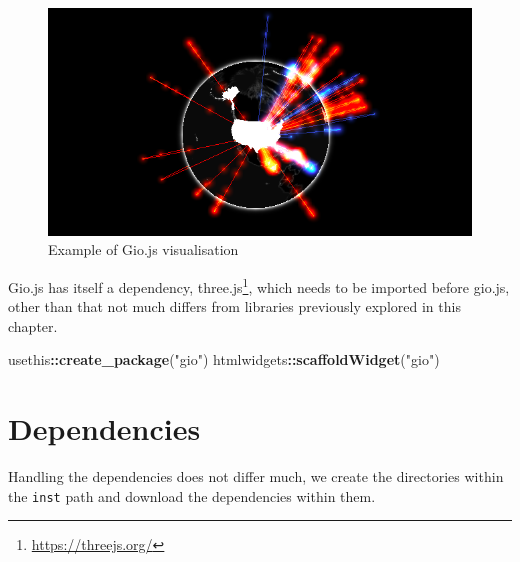 \documentclass[
]{krantz}
\makeatletter
\newenvironment{Shaded}{\begin{snugshade}}{\end{snugshade}}
\newcommand{\KeywordTok}[1]{\textcolor[rgb]{0.27,0.27,0.27}{\textbf{#1}}}
\newcommand{\NormalTok}[1]{#1}
\newcommand{\OperatorTok}[1]{\textcolor[rgb]{0.43,0.43,0.43}{\textbf{#1}}}
\newcommand{\StringTok}[1]{\textcolor[rgb]{0.5,0.5,0.5}{#1}}
\renewcommand{\href}[2]{#2\footnote{\url{#1}}}
\newenvironment{kframe}{%
\medskip{}
\setlength{\fboxsep}{.8em}
 \def\at@end@of@kframe{}%
 \ifinner\ifhmode%
  \def\at@end@of@kframe{\end{minipage}}%
  \begin{minipage}{\columnwidth}%
 \fi\fi%
 \def\FrameCommand##1{\hskip\@totalleftmargin \hskip-\fboxsep
 \colorbox{shadecolor}{##1}\hskip-\fboxsep
     \hskip-\linewidth \hskip-\@totalleftmargin \hskip\columnwidth}%
 \MakeFramed {\advance\hsize-\width
   \@totalleftmargin\z@ \linewidth\hsize
   \@setminipage}}%
 {\par\unskip\endMakeFramed%
 \at@end@of@kframe}
\renewenvironment{Shaded}{\begin{kframe}}{\end{kframe}}
\makeatother
\begin{document}
\begin{figure}
\centering
\includegraphics{images/gio-example.png}
\caption{Example of Gio.js visualisation}
\end{figure}

Gio.js has itself a dependency, \href{https://threejs.org/}{three.js}, which needs to be imported before gio.js, other than that not much differs from libraries previously explored in this chapter.

\begin{Shaded}
\begin{Highlighting}[]
\NormalTok{usethis}\OperatorTok{::}\KeywordTok{create\_package}\NormalTok{(}\StringTok{"gio"}\NormalTok{)}
\NormalTok{htmlwidgets}\OperatorTok{::}\KeywordTok{scaffoldWidget}\NormalTok{(}\StringTok{"gio"}\NormalTok{)}
\end{Highlighting}
\end{Shaded}

\hypertarget{widgets-full-deps}{%
\section{Dependencies}\label{widgets-full-deps}}

Handling the dependencies does not differ much, we create the directories within the \texttt{inst} path and download the dependencies within them.
\end{document}
